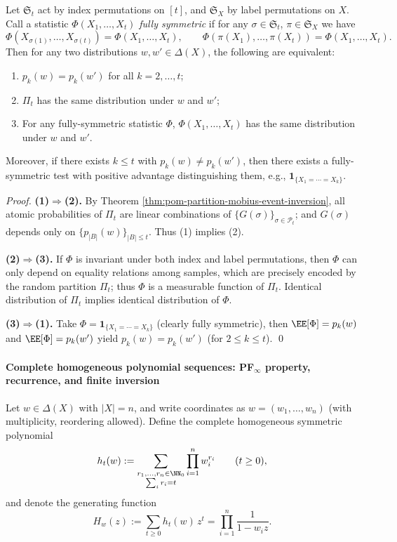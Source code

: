 \begin{theorem}\label{thm:pom-finite-sample-indistinguishability-power-sums}
Let \(\mathfrak{S}_t\) act by index permutations on \([t]\), and \(\mathfrak{S}_X\) by label permutations on \(X\).
Call a statistic \(\Phi(X_1,\dots,X_t)\) \emph{fully symmetric} if for any \(\sigma\in\mathfrak{S}_t\), \(\pi\in\mathfrak{S}_X\) we have
\[
\Phi(X_{\sigma(1)},\dots,X_{\sigma(t)})=\Phi(X_1,\dots,X_t),
\qquad
\Phi(\pi(X_1),\dots,\pi(X_t))=\Phi(X_1,\dots,X_t).
\]
Then for any two distributions \(w,w'\in\Delta(X)\), the following are equivalent:
\begin{enumerate}
  \item \(p_k(w)=p_k(w')\) for all \(k=2,\dots,t\);
  \item \(\Pi_t\) has the same distribution under \(w\) and \(w'\);
  \item For any fully-symmetric statistic \(\Phi\), \(\Phi(X_1,\dots,X_t)\) has the same distribution under \(w\) and \(w'\).
\end{enumerate}
Moreover, if there exists \(k\le t\) with \(p_k(w)\neq p_k(w')\), then there exists a fully-symmetric test with positive advantage distinguishing them, e.g., \(\mathbf{1}_{\{X_1=\cdots=X_k\}}\).
\end{theorem}
\begin{proof}
\textbf{(1)\(\Rightarrow\)(2).}
By Theorem \ref{thm:pom-partition-mobius-event-inversion}, all atomic probabilities of \(\Pi_t\) are linear combinations of \(\{G(\sigma)\}_{\sigma\in\mathcal{P}_t}\);
and \(G(\sigma)\) depends only on \(\{p_{|B|}(w)\}_{|B|\le t}\).
Thus (1) implies (2).
\par
\textbf{(2)\(\Rightarrow\)(3).}
If \(\Phi\) is invariant under both index and label permutations, then \(\Phi\) can only depend on equality relations among samples,
which are precisely encoded by the random partition \(\Pi_t\); thus \(\Phi\) is a measurable function of \(\Pi_t\).
Identical distribution of \(\Pi_t\) implies identical distribution of \(\Phi\).
\par
\textbf{(3)\(\Rightarrow\)(1).}
Take \(\Phi=\mathbf 1_{\{X_1=\cdots=X_k\}}\) (clearly fully symmetric), then
\(
\EE[\Phi]=p_k(w)
\)
and
\(
\EE[\Phi]=p_k(w')
\)
yield \(p_k(w)=p_k(w')\) (for \(2\le k\le t\)). \qed
\end{proof}

\paragraph{Complete homogeneous polynomial sequences: PF\texorpdfstring{$_\infty$}{∞} property, recurrence, and finite inversion}
Let \(w\in\Delta(X)\) with \(|X|=n\), and write coordinates as \(w=(w_1,\dots,w_n)\) (with multiplicity, reordering allowed).
Define the complete homogeneous symmetric polynomial
\[
h_t(w):=\sum_{\substack{r_1,\dots,r_n\in\NN_0\\ \sum_i r_i=t}}\prod_{i=1}^n w_i^{r_i}\qquad(t\ge0),
\]
and denote the generating function
\[
H_w(z):=\sum_{t\ge0}h_t(w)\,z^t=\prod_{i=1}^n\frac{1}{1-w_i z}.
\]

